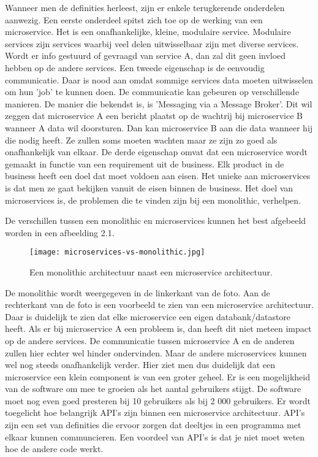  Wanneer men de definities herleest, zijn er enkele terugkerende onderdelen aanwezig. Een eerste onderdeel spitst zich toe op de  werking van een microservice. Het is een onafhankelijke, kleine, modulaire service. Modulaire services zijn services waarbij veel delen uitwisselbaar zijn met diverse services. Wordt er info gestuurd of gevraagd van service A, dan zal dit geen invloed hebben op de andere services. Een tweede eigenschap is de eenvoudig communicatie. Daar is nood aan omdat sommige services data moeten uitwisselen om hun 'job' te kunnen doen. De communicatie kan gebeuren op verschillende manieren. De manier die bekendst is, is 'Messaging via a Message Broker'. Dit wil zeggen dat microservice A een bericht plaatst op de wachtrij bij microservice B wanneer A data wil doorsturen. Dan kan microservice B aan die data wanneer hij die nodig heeft. Ze zullen soms moeten wachten maar ze zijn zo goed als onafhankelijk van elkaar. De derde eigenschap omvat dat een microservice wordt gemaakt in functie van een requirement uit de business. Elk product in de business heeft een doel dat moet voldoen aan eisen. Het unieke aan microservices is dat  men  ze gaat bekijken vanuit de eisen binnen de business. Het doel van microservices is, de problemen die te vinden zijn bij een monolithic, verhelpen. 
 
 De verschillen tussen een monolithic en microservices kunnen het best afgebeeld worden in een afbeelding 2.1.

\begin{figure}[h!]
	\texttt{[image: microservices-vs-monolithic.jpg]}
	\centering
	\caption{Een monolithic architectuur naast een microservice architectuur. \textcite{Watts2018}}
\end{figure}
 De monolithic wordt  weergegeven in de linkerkant van de foto. Aan de rechterkant van de foto is een voorbeeld te zien van een microservice architectuur. Daar is duidelijk te zien dat elke microservice een eigen databank/datastore heeft. 
 Als er bij microservice A een probleem is, dan heeft dit niet meteen impact op de andere services. De communicatie tussen microservice A en de anderen zullen hier echter wel hinder ondervinden. Maar de andere microservices kunnen wel nog steeds onafhankelijk verder. 
 Hier ziet men dus duidelijk dat een microservice een klein component is van een groter geheel.
 Er is een mogelijkheid van de software om mee te groeien als het aantal gebruikers stijgt. De software moet nog even goed presteren bij 10 gebruikers als bij 2 000 gebruikers. Er wordt toegelicht hoe belangrijk API's zijn binnen een microservice architectuur. API's zijn een set van definities die ervoor zorgen dat deeltjes in een programma met elkaar kunnen communcieren. Een voordeel van API's is dat je niet moet  weten hoe de andere code werkt.

